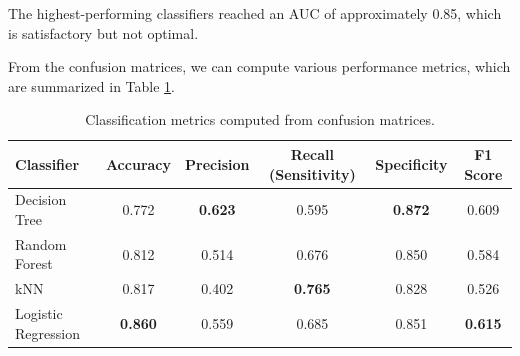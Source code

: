 \documentclass[a4paper,11pt]{article}
\begin{document}
The highest-performing classifiers reached an AUC of approximately 0.85, which is satisfactory but not optimal.

From the confusion matrices, we can compute various performance metrics, which are summarized in Table \ref{tab:classification_metrics}.

\begin{table}
\centering
\begin{tabular}{lccccc}
    \toprule
    \textbf{Classifier} & \textbf{Accuracy} & \textbf{Precision} & \textbf{Recall (Sensitivity)} & \textbf{Specificity} & \textbf{F1 Score} \\
    \midrule
    Decision Tree       & 0.772 & \textbf{0.623} & 0.595 & \textbf{0.872} & 0.609 \\
    Random Forest       & 0.812 & 0.514 & 0.676 & 0.850 & 0.584 \\
    kNN                 & 0.817 & 0.402 & \textbf{0.765} & 0.828 & 0.526 \\
    Logistic Regression & \textbf{0.860} & 0.559 & 0.685 & 0.851 & \textbf{0.615} \\
    \bottomrule
\end{tabular}
\caption{Classification metrics computed from confusion matrices.}
\label{tab:classification_metrics}
\end{table}
\end{document}

